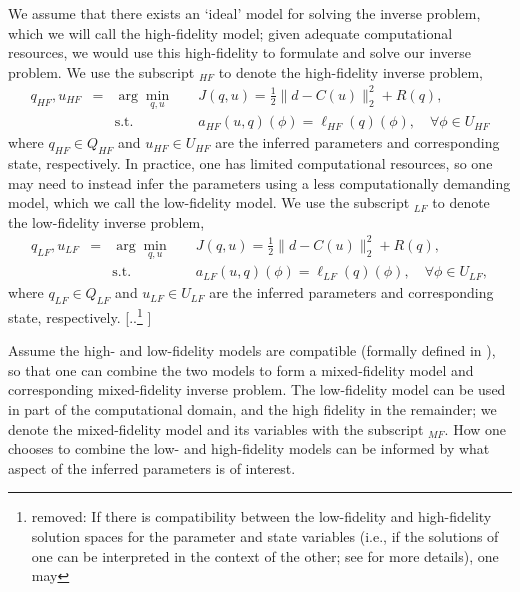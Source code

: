 \documentclass[review,sort&compress]{elsarticle}
\theoremstyle{plain} %
\theoremstyle{definition} %
\providecommand{\DIFaddtex}[1]{{\protect\color{blue} \sf #1}} %
\providecommand{\DIFdeltex}[1]{{\protect\color{red} [..\footnote{removed: #1} ]}} %
\providecommand{\DIFaddbegin}{} %
\providecommand{\DIFaddend}{} %
\providecommand{\DIFdelbegin}{} %
\providecommand{\DIFdelend}{} %
\providecommand{\DIFadd}[1]{\texorpdfstring{\DIFaddtex{#1}}{#1}} %
\providecommand{\DIFdel}[1]{\texorpdfstring{\DIFdeltex{#1}}{}} %
\newcommand{\DIFscaledelfig}{0.5}
\newlength{\DIFdelgraphicswidth} %
\newlength{\DIFdelgraphicsheight} %
\newcommand{\DIFaddincludegraphics}[2][]{{\color{blue}\fbox{\DIFOincludegraphics[#1]{#2}}}} %
\newcommand{\DIFdelincludegraphics}[2][]{%
\sbox{\DIFdelgraphicsbox}{\DIFOincludegraphics[#1]{#2}}%
\settoboxwidth{\DIFdelgraphicswidth}{\DIFdelgraphicsbox} %
\settoboxtotalheight{\DIFdelgraphicsheight}{\DIFdelgraphicsbox} %
\scalebox{\DIFscaledelfig}{%
\parbox[b]{\DIFdelgraphicswidth}{\usebox{\DIFdelgraphicsbox}\\[-\baselineskip] \rule{\DIFdelgraphicswidth}{0em}}\llap{\resizebox{\DIFdelgraphicswidth}{\DIFdelgraphicsheight}{%
\setlength{\unitlength}{\DIFdelgraphicswidth}%
\begin{picture}(1,1)%
\thicklines\linethickness{2pt} %
{\color[rgb]{1,0,0}\put(0,0){\framebox(1,1){}}}%
{\color[rgb]{1,0,0}\put(0,0){\line( 1,1){1}}}%
{\color[rgb]{1,0,0}\put(0,1){\line(1,-1){1}}}%
\end{picture}%
}\hspace*{3pt}}} %
} %
\DeclareRobustCommand{\DIFaddbegin}{\DIFOaddbegin \let\includegraphics\DIFaddincludegraphics} %
\DeclareRobustCommand{\DIFaddend}{\DIFOaddend \let\includegraphics\DIFOincludegraphics} %
\DeclareRobustCommand{\DIFdelbegin}{\DIFOdelbegin \let\includegraphics\DIFdelincludegraphics} %
\DeclareRobustCommand{\DIFdelend}{\DIFOaddend \let\includegraphics\DIFOincludegraphics} %
\begin{document}
We assume that there exists an `ideal' model for solving the inverse problem, which we will call the high-fidelity model; given adequate computational resources, we would use this high-fidelity to formulate and solve our inverse problem. We use the subscript $_{HF}$ to denote the high-fidelity inverse problem,
%
\begin{subequations}
\label{eq:invOptHF}
\begin{align}
q_{HF},u_{HF} &=&\arg\min\limits_{q,u} & \quad J(q,u)=\frac{1}{2}\|d-C(u)\|_2^2 + R(q), \label{eq:invOpt_objHF} \\
&&\textrm{s.t. }& \quad a_{HF}(u,q)(\phi)=\ell_{HF}(q)(\phi),\quad\forall\phi\in U_{HF} \label{eq:invOpt_consHF}
\end{align}
\end{subequations}
%
where $q_{HF} \in Q_{HF}$ and $u_{HF}\in U_{HF}$ are the inferred parameters and corresponding state, respectively. In practice, one has limited computational resources, so one may need to instead infer the parameters using a less computationally demanding model, which we call the low-fidelity model. We use the subscript $_{LF}$ to denote the low-fidelity inverse problem,
%
\begin{subequations}
\label{eq:invOptLF}
\begin{align}
q_{LF},u_{LF} &=& \arg\min\limits_{q,u} & \quad J(q,u)=\frac{1}{2}\|d-C(u)\|_2^2 + R(q), \label{eq:invOpt_objLF} \\
&& \textrm{s.t. }& \quad a_{LF}(u,q)(\phi)=\ell_{LF}(q)(\phi),\quad\forall\phi\in U_{LF}, \label{eq:invOpt_consLF}
\end{align}
\end{subequations}
%
where $q_{LF} \in Q_{LF}$ and $u_{LF}\in U_{LF}$ are the inferred parameters and corresponding state, respectively. 
\DIFdelbegin \DIFdel{If there is compatibility between the low-fidelity and high-fidelity solution spaces for the parameter and state variables (i.e., if the solutions of one can be interpreted in the context of the other; see \Cref{sec:adapt_alg} for more details), one may }\DIFdelend \DIFaddbegin 

\DIFadd{Assume the high- and low-fidelity models are compatible (formally defined in \Cref{defn:comp}), so that one can }\DIFaddend combine the two models to form a mixed-fidelity model and corresponding mixed-fidelity inverse problem. The low-fidelity model can be used in part of the computational domain, and the high fidelity in the remainder; we denote the mixed-fidelity model and its variables with the subscript $_{MF}$. How one chooses to combine the low- and high-fidelity models can be informed by what aspect of the inferred parameters is of interest.
\end{document}
